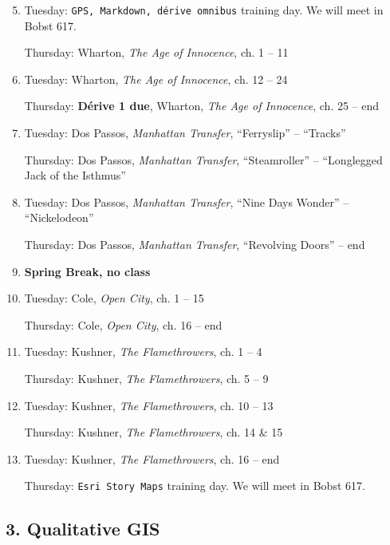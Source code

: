 \begin{enumerate}
  \setcounter{enumi}{4}
\item Tuesday: \texttt{GPS, Markdown, dérive omnibus} training day. We will meet in Bobst 617.

  Thursday: Wharton, \textit{The Age of Innocence}, ch. 1 -- 11

  \item Tuesday: Wharton, \textit{The Age of Innocence},  ch. 12 -- 24

    Thursday: \textbf{\small Dérive 1 due}, Wharton,  \textit{The Age of Innocence}, ch. 25 -- end
  
  \item Tuesday: Dos Passos, \textit{Manhattan Transfer}, “Ferryslip” -- “Tracks”

    Thursday: Dos Passos,  \textit{Manhattan Transfer}, “Steamroller” -- “Longlegged Jack of the Isthmus”

  \item Tuesday: Dos Passos,  \textit{Manhattan Transfer}, “Nine Days Wonder” -- “Nickelodeon”

    Thursday: Dos Passos,  \textit{Manhattan Transfer}, “Revolving Doors” -- end

  \item \textbf{Spring Break, no class}

  \item Tuesday: Cole, \textit{Open City}, ch. 1 -- 15

    Thursday: Cole,  \textit{Open City}, ch. 16 -- end

  \item Tuesday: Kushner, \textit{The Flamethrowers}, ch. 1 -- 4

    Thursday: Kushner, \textit{The Flamethrowers}, ch. 5 -- 9

  \item Tuesday: Kushner, \textit{The Flamethrowers}, ch. 10 -- 13 
  
    Thursday: Kushner, \textit{The Flamethrowers}, ch. 14 \& 15

  \item Tuesday: Kushner, \textit{The Flamethrowers}, ch. 16 -- end 

    Thursday: \texttt{Esri Story Maps} training day. We will meet in Bobst 617.

\end{enumerate}

\subsection{3. Qualitative GIS}

